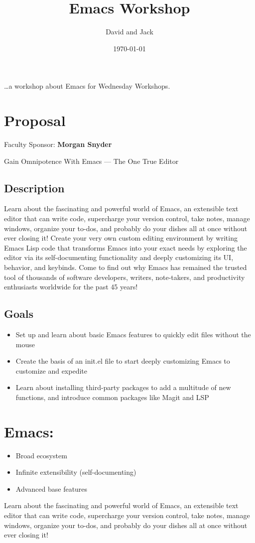 \documentclass[letterpaper]{article}
\author{David and Jack}
\date{\today}
\title{Emacs Workshop}
\renewcommand{\tableofcontents}{}
\begin{document}
\tableofcontents

\ldots{}a workshop about Emacs for Wednesday Workshops.


\section{Proposal}
\label{sec:org0031af7}
Faculty Sponsor: \textbf{\textbf{Morgan Snyder}}

Gain Omnipotence With Emacs — The One True Editor

\subsection{Description}
\label{sec:org11bbceb}
Learn about the fascinating and powerful world of Emacs, an extensible
text editor that can write code, supercharge your version control,
take notes, manage windows, organize your to-dos, and probably do your
dishes all at once without ever closing it! Create your very own
custom editing environment by writing Emacs Lisp code that transforms
Emacs into your exact needs by exploring the editor via its
self-documenting functionality and deeply customizing its UI,
behavior, and keybinds. Come to find out why Emacs has remained the
trusted tool of thousands of software developers, writers,
note-takers, and productivity enthusiasts worldwide for the past 45
years!

\subsection{Goals}
\label{sec:org13dbef5}
\begin{itemize}
\item Set up and learn about basic Emacs features to quickly edit files without the mouse
\item Create the basis of an init.el file to start deeply customizing Emacs to customize and expedite
\item Learn about installing third-party packages to add a multitude of new functions, and introduce common packages like Magit and LSP
\end{itemize}


\section{Emacs:}
\label{sec:org608547a}
\begin{itemize}
\item Broad ecosystem
\item Infinite extensibility (self-documenting)
\item Advanced base features
\end{itemize}

Learn about the fascinating and powerful world of Emacs, an extensible text editor that can write code, supercharge your version control, take notes, manage windows, organize your to-dos, and probably do your dishes all at once without ever closing it! 
\end{document}

